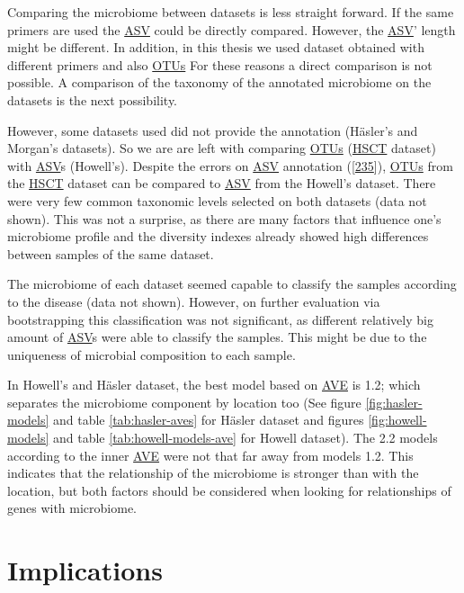 \documentclass[
  12pt,
  a4paper,
  twoside,
  openright]{book}
\begin{document}
Comparing the microbiome between datasets is less straight forward.
If the same primers are used the \protect\hyperlink{acronyms_ASV}{ASV} could be directly compared.
However, the \protect\hyperlink{acronyms_ASV}{ASV}' length might be different.
In addition, in this thesis we used dataset obtained with different primers and also \protect\hyperlink{acronyms_OTUs}{OTUs}
For these reasons a direct comparison is not possible.
A comparison of the taxonomy of the annotated microbiome on the datasets is the next possibility.

However, some datasets used did not provide the annotation (Häsler's and Morgan's datasets).
So we are are left with comparing \protect\hyperlink{acronyms_OTUs}{OTUs} (\protect\hyperlink{acronyms_HSCT}{HSCT} dataset) with \protect\hyperlink{acronyms_ASV}{ASV}s (Howell's).
Despite the errors on \protect\hyperlink{acronyms_ASV}{ASV} annotation ({[}\protect\hyperlink{ref-edgar2018}{235}{]}), \protect\hyperlink{acronyms_OTUs}{OTUs} from the \protect\hyperlink{acronyms_HSCT}{HSCT} dataset can be compared to \protect\hyperlink{acronyms_ASV}{ASV} from the Howell's dataset.
There were very few common taxonomic levels selected on both datasets (data not shown).
This was not a surprise, as there are many factors that influence one's microbiome profile and the diversity indexes already showed high differences between samples of the same dataset.

The microbiome of each dataset seemed capable to classify the samples according to the disease (data not shown).
However, on further evaluation via bootstrapping this classification was not significant, as different relatively big amount of \protect\hyperlink{acronyms_ASV}{ASV}s were able to classify the samples.
This might be due to the uniqueness of microbial composition to each sample.

In Howell's and Häsler dataset, the best model based on \protect\hyperlink{acronyms_AVE}{AVE} is 1.2; which separates the microbiome component by location too (See figure \ref{fig:hasler-models} and table \ref{tab:hasler-aves} for Häsler dataset and figures \ref{fig:howell-models} and table \ref{tab:howell-models-ave} for Howell dataset).
The 2.2 models according to the inner \protect\hyperlink{acronyms_AVE}{AVE} were not that far away from models 1.2.
This indicates that the relationship of the microbiome is stronger than with the location, but both factors should be considered when looking for relationships of genes with microbiome.

\hypertarget{implications}{%
\section{Implications}\label{implications}}
\end{document}
